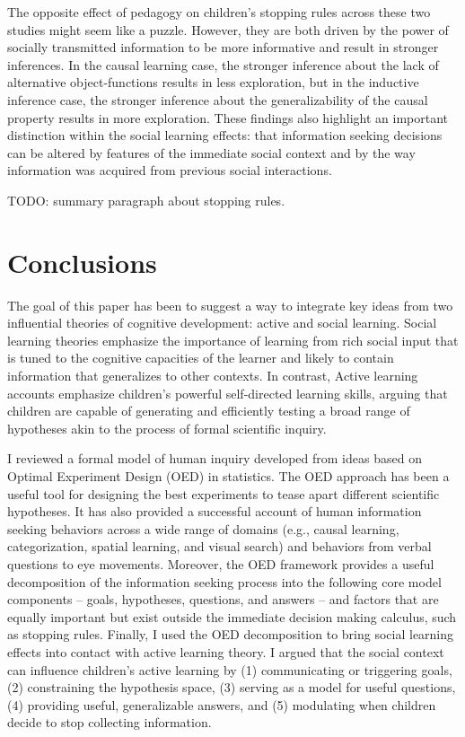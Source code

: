 \documentclass[english,floatsintext,man]{apa6}
\theoremstyle{definition}
\theoremstyle{definition}
\theoremstyle{definition}
\theoremstyle{remark}
\begin{document}
The opposite effect of pedagogy on children's stopping rules across
these two studies might seem like a puzzle. However, they are both
driven by the power of socially transmitted information to be more
informative and result in stronger inferences. In the causal learning
case, the stronger inference about the lack of alternative
object-functions results in less exploration, but in the inductive
inference case, the stronger inference about the generalizability of the
causal property results in more exploration. These findings also
highlight an important distinction within the social learning effects:
that information seeking decisions can be altered by features of the
immediate social context and by the way information was acquired from
previous social interactions.

TODO: summary paragraph about stopping rules.

\section{Conclusions}\label{conclusions}

The goal of this paper has been to suggest a way to integrate key ideas
from two influential theories of cognitive development: active and
social learning. Social learning theories emphasize the importance of
learning from rich social input that is tuned to the cognitive
capacities of the learner and likely to contain information that
generalizes to other contexts. In contrast, Active learning accounts
emphasize children's powerful self-directed learning skills, arguing
that children are capable of generating and efficiently testing a broad
range of hypotheses akin to the process of formal scientific inquiry.

I reviewed a formal model of human inquiry developed from ideas based on
Optimal Experiment Design (OED) in statistics. The OED approach has been
a useful tool for designing the best experiments to tease apart
different scientific hypotheses. It has also provided a successful
account of human information seeking behaviors across a wide range of
domains (e.g., causal learning, categorization, spatial learning, and
visual search) and behaviors from verbal questions to eye movements.
Moreover, the OED framework provides a useful decomposition of the
information seeking process into the following core model components --
goals, hypotheses, questions, and answers -- and factors that are
equally important but exist outside the immediate decision making
calculus, such as stopping rules. Finally, I used the OED decomposition
to bring social learning effects into contact with active learning
theory. I argued that the social context can influence children's active
learning by (1) communicating or triggering goals, (2) constraining the
hypothesis space, (3) serving as a model for useful questions, (4)
providing useful, generalizable answers, and (5) modulating when
children decide to stop collecting information.
\end{document}
